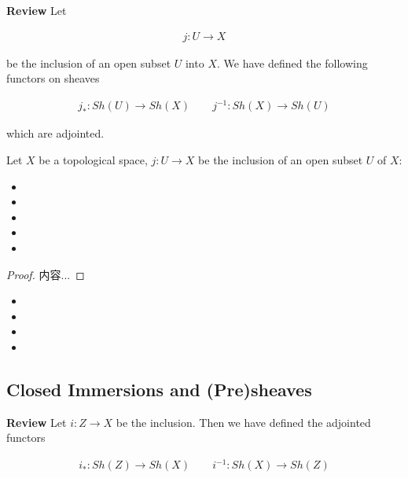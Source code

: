 \documentclass[Total.tex]{subfiles}
\begin{document}
				\textbf{Review} Let
				
				\begin{gather*}
					j:U\rightarrow X
				\end{gather*}
				
				be the inclusion of an open subset $U$ into $X$. We have defined the following functors on sheaves
				
				\begin{gather*}
					j_*:Sh(U)\rightarrow Sh(X)\qquad j^{-1}:Sh(X)\rightarrow Sh(U)
				\end{gather*}
				
				which are adjointed.
				
				\begin{lemma}
					Let $X$ be a topological space, $j:U\rightarrow X$ be the inclusion of an open subset $U$ of $X$:
					
					\begin{itemize}
						\item 
						\item 
						\item 
						\item 
						\item 
					\end{itemize}
				\end{lemma}
				
				\begin{proof}
					内容...
				\end{proof}
				
				\begin{Def}
					\begin{itemize}
						\item 
						\item 
						\item 
						\item 
					\end{itemize}
				\end{Def}
			
			\subsection{Closed Immersions and (Pre)sheaves}
			
				\textbf{Review} Let $i:Z\rightarrow X$ be the inclusion. Then we have defined the adjointed functors
				
				\begin{gather*}
					i_*:Sh(Z)\rightarrow Sh(X)\qquad i^{-1}:Sh(X)\rightarrow Sh(Z)
				\end{gather*}
				
\end{document}
